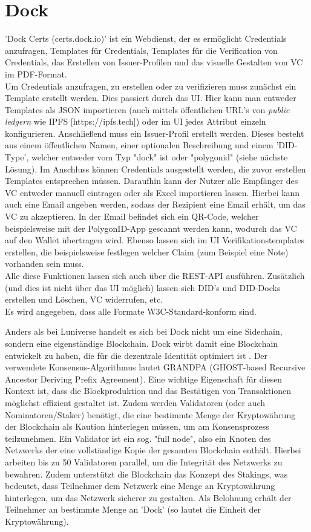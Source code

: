 \section{Dock}
'Dock Certs (certs.dock.io)' ist ein Webdienst, der es ermöglicht Credentials anzufragen, Templates für Credentials, Templates für die Verification von Credentials, das Erstellen von Issuer-Profilen und das visuelle Gestalten von VC im PDF-Format.\\
Um Credentials anzufragen, zu erstellen oder zu verifizieren muss zunächst ein Template erstellt werden. Dies passiert durch das UI. Hier kann man entweder Templates als JSON importieren (auch mittels öffentlichen URL's von \textsl{public ledgern} wie IPFS [https://ipfs.tech]) oder im UI jedes Attribut einzeln konfigurieren. Anschließend muss ein Issuer-Profil erstellt werden. Dieses besteht aus einem öffentlichen Namen, einer optionalen Beschreibung und einem 'DID-Type', welcher entweder vom Typ "dock" ist oder "polygonid" (siehe nächste Lösung).
Im Anschluss können Credentials ausgestellt werden, die zuvor erstellen Templates entsprechen müssen. Daraufhin kann der Nutzer alle Empfänger des VC entweder manuell eintragen oder als Excel importieren lassen. Hierbei kann auch eine Email angeben werden, sodass der Rezipient eine Email erhält, um das VC zu akzeptieren. In der Email befindet sich ein QR-Code, welcher beispielsweise mit der PolygonID-App gescannt werden kann, wodurch das VC auf den Wallet übertragen wird.
Ebenso lassen sich im UI Verifikationstemplates erstellen, die beispielsweise festlegen welcher Claim (zum Beispiel eine Note) vorhanden sein muss.\\
Alle diese Funktionen lassen sich auch über die REST-API ausführen. Zusätzlich (und dies ist nicht über das UI möglich) lassen sich DID's und DID-Docks erstellen und Löschen, VC widerrufen, etc. \\
Es wird angegeben, dass alle Formate W3C-Standard-konform sind.

Anders als bei Luniverse handelt es sich bei Dock nicht um eine Sidechain, sondern eine eigenständige Blockchain. Dock wirbt damit eine Blockchain entwickelt zu haben, die für die dezentrale Identität optimiert ist \cite{ID30}. Der verwendete Konsensus-Algorithmus lautet GRANDPA (GHOST-based Recursive Ancestor Deriving Prefix Agreement). Eine wichtige Eigenschaft für diesen Kontext ist, dass die Blockproduktion und das Bestätigen von Transaktionen möglichst effizient gestaltet ist. Zudem werden Validatoren (oder auch Nominatoren/Staker) benötigt, die eine bestimmte Menge der Kryptowährung der Blockchain als Kaution hinterlegen müssen, um am Konsensprozess teilzunehmen. Ein Validator ist ein sog. "full node", also ein Knoten des Netzwerks der eine vollständige Kopie der gesamten Blockchain enthält. Hierbei arbeiten bis zu 50 Validatoren parallel, um die Integrität des Netzwerks zu bewahren. Zudem unterstützt die Blockchain das Konzept des Stakings, was bedeutet, dass Teilnehmer dem Netzwerk eine Menge an Kryptowährung hinterlegen, um das Netzwerk sicherer zu gestalten. Als Belohnung erhält der Teilnehmer an bestimmte Menge an 'Dock' (so lautet die Einheit der Kryptowährung).


